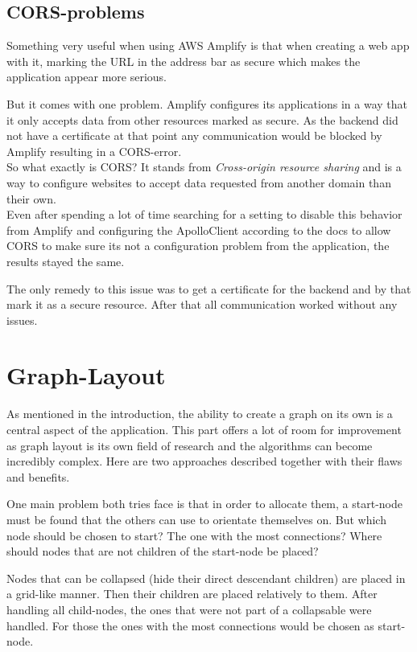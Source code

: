 \subsection{CORS-problems}
Something very useful when using AWS Amplify is that when creating a web app with it, marking the URL in the address bar as secure which makes the application appear more serious.

But it comes with one problem. Amplify configures its applications in a way that it only accepts data from other resources marked as secure. As the backend did not have a certificate at that point any communication would be blocked by Amplify resulting in a CORS-error. \\

So what exactly is CORS? It stands from \emph{Cross-origin resource sharing} and is a way to configure websites to accept data requested from another domain than their own. \\

Even after spending a lot of time searching for a setting to disable this behavior from Amplify and configuring the ApolloClient according to the docs to allow CORS to make sure its not a configuration problem from the application, the results stayed the same.

The only remedy to this issue was to get a certificate for the backend and by that mark it as a secure resource. After that all communication worked without any issues.

\newpage
\section{Graph-Layout}
As mentioned in the introduction, the ability to create a graph on its own is a central aspect of the application. This part offers a lot of room for improvement as graph layout is its own field of research and the algorithms can become incredibly complex. Here are two approaches described together with their flaws and benefits.

One main problem both tries face is that in order to allocate them, a start-node must be found that the others can use to orientate themselves on. But which node should be chosen to start? The one with the most connections? Where should nodes that are not children of the start-node be placed? 

Nodes that can be collapsed (hide their direct descendant children) are placed in a grid-like manner. Then their children are placed relatively to them. After handling all child-nodes, the ones that were not part of a collapsable were handled. For those the ones with the most connections would be chosen as start-node.

